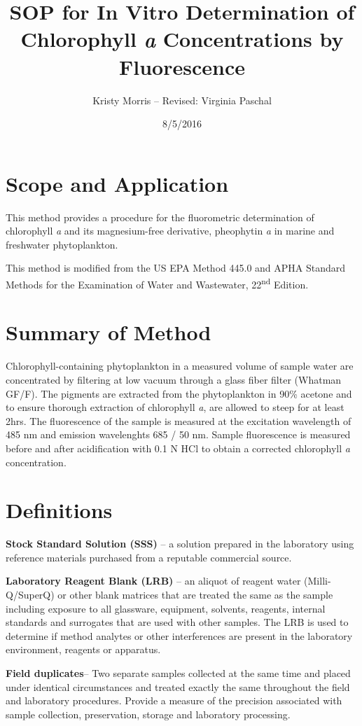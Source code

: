 \documentclass[12pt]{../SOP3}\usepackage[]{graphicx}\usepackage[]{color}
\author{Kristy Morris -- Revised: Virginia Paschal}
\title{SOP for In Vitro Determination of Chlorophyll \textit{a} Concentrations by Fluorescence}
\date{8/5/2016}
\begin{document}
\maketitle

 \section{Scope and Application}

\NP This method provides a procedure for the fluorometric determination of chlorophyll \textit{a} and its magnesium-free derivative, pheophytin \textit{a} in marine and freshwater phytoplankton.

\NP This method is modified from the US EPA Method 445.0 and APHA Standard Methods for the Examination of Water and Wastewater, 22\textsuperscript{nd} Edition. 

\section{Summary of Method}

\NP Chlorophyll-containing phytoplankton in a measured volume of sample water are concentrated by filtering at low vacuum through a glass fiber filter (Whatman GF/F). The pigments are extracted from the phytoplankton in 90\% acetone and to ensure thorough extraction of chlorophyll \textit{a}, are allowed to steep for at least 2hrs. The fluorescence of the sample is measured at the excitation wavelength of 485 nm and emission wavelenghts 685 / 50 nm. Sample fluorescence is measured before and after acidification with 0.1 N HCl to obtain a corrected chlorophyll \textit{a} concentration. 


\section{Definitions}
\NP \textbf{Stock Standard Solution (SSS)} -- a solution prepared in the laboratory using reference materials purchased from a reputable commercial source.

\NP \textbf{Laboratory Reagent Blank (LRB)} -- an aliquot of reagent water (Milli-Q/SuperQ) or other blank matrices that are treated the same as the sample including exposure to all glassware, equipment, solvents, reagents, internal standards and surrogates that are used with other samples. The LRB is used to determine if method analytes or other interferences are present in the laboratory environment, reagents or apparatus. 

\NP \textbf{Field duplicates}-- Two separate samples collected at the same time and placed under identical circumstances and treated exactly the same throughout the field and laboratory procedures. Provide a measure of the precision associated with sample collection, preservation, storage and laboratory processing. 
\end{document}
